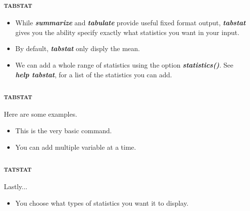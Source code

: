 \documentclass[10pt]{beamer}
\begin{document}
		
	\begin{frame}
	\frametitle{\textsc{tabstat}}
		\begin{itemize}
			\item While \textbf{\textit{summarize}} and \textbf{\textit{tabulate}} 
				  provide useful fixed format output, 
				  \textbf{\textit{tabstat}} gives you the ability specify 
				  exactly what statistics you want in your input.
			\item By default, \textbf{\textit{tabstat}} only disply the mean.
			\item We can add a whole range of statistics using the option 
				  \textbf{\textit{statistics()}}. 
				  See \textbf{\textit{help tabstat}}, for a list of the statistics you can add.
		\end{itemize}
	\end{frame}
	
	\begin{frame}
	\frametitle{\textsc{tabstat}}
		Here are some examples.
		\begin{itemize}
			\item This is the very basic command.
\begin{stlog}\end{stlog}
			\vspace{2mm}
			\item You can add multiple variable at a time.
\begin{stlog}\end{stlog}
		\end{itemize}
	\end{frame}
		
	\begin{frame}
	\frametitle{\textsc{tatstat}}
	Lastly...
		\begin{itemize}
			\vspace{2mm}
			\item You choose what types of statistics you want it to display.
\begin{stlog}\end{stlog}
		\end{itemize}
	\end{frame}
	
\end{document}
